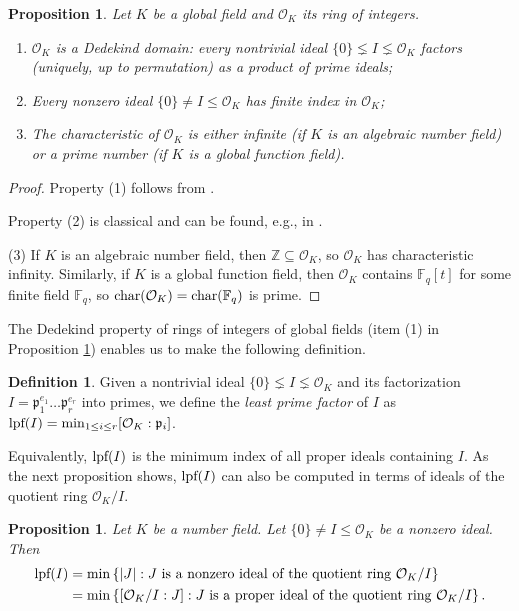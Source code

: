 \documentclass{amsart}
\newtheorem{proposition}[theorem]{Proposition}
\theoremstyle{definition}
\newtheorem{definition}[theorem]{Definition}
\numberwithin{equation}{section}
\newcommand{\Z}{\mathbb{Z}}
\newcommand{\F}{\mathbb{F}}
\newcommand{\p}{\mathfrak{p}}
\newcommand{\mO}{\mathcal{O}}
\newcommand{\lpf}{\normalfont\text{lpf}}
\renewcommand{\char}{\textup{char}}
\begin{document}
\begin{proposition} \label{prop: rings of integers}
	Let $K$ be a global field and $\mO_K$ its ring of integers.
	\begin{enumerate}
		\item	$\mO_K$ is a Dedekind domain: every nontrivial ideal $\{0\} \lneq I \lneq \mO_K$ factors (uniquely, up to permutation) as a product of prime ideals;
		\item	Every nonzero ideal $\{0\} \ne I \le \mO_K$ has finite index in $\mO_K$;
		\item	The characteristic of $\mO_K$ is either infinite (if $K$ is an algebraic number field) or a prime number (if $K$ is a global function field).
	\end{enumerate}
\end{proposition}

\begin{proof}
    Property (1) follows from \cite[Theorem 3.29]{milne}.

    Property (2) is classical and can be found, e.g., in \cite[Section I.8]{janusz}.

    (3) If $K$ is an algebraic number field, then $\Z \subseteq \mO_K$, so $\mO_K$ has characteristic infinity.
    Similarly, if $K$ is a global function field, then $\mO_K$ contains $\F_q[t]$ for some finite field $\F_q$, so $\char(\mO_K) = \char(\F_q)$ is prime.
\end{proof}

The Dedekind property of rings of integers of global fields (item (1) in Proposition \ref{prop: rings of integers}) enables us to make the following definition.

\begin{definition} \label{defn: lpf}
    Given a nontrivial ideal $\{0\} \lneq I \lneq \mO_K$ and its factorization $I = \p_1^{e_1} \dots \p_r^{e_r}$ into primes, we define the \emph{least prime factor} of $I$ as $\lpf(I) = \min_{1 \le i \le r} [\mO_K : \p_i]$.
\end{definition}

Equivalently, $\lpf(I)$ is the minimum index of all proper ideals containing $I$.
As the next proposition shows, $\lpf(I)$ can also be computed in terms of ideals of the quotient ring $\mO_K/I$.

\begin{proposition} \label{prop: lpf finite ring ideals}
	Let $K$ be a number field.
	Let $\{0\} \ne I \le \mO_K$ be a nonzero ideal.
	Then
	\begin{align*}
		\lpf(I) & = \min \left\{ |J| : J~\text{is a nonzero ideal of the quotient ring}~\mO_K/I \right\} \\
		 & = \min \left\{ [\mO_K/I : J] : J~\text{is a proper ideal of the quotient ring}~\mO_K/I \right\}.
	\end{align*}
\end{proposition}
\end{document}
